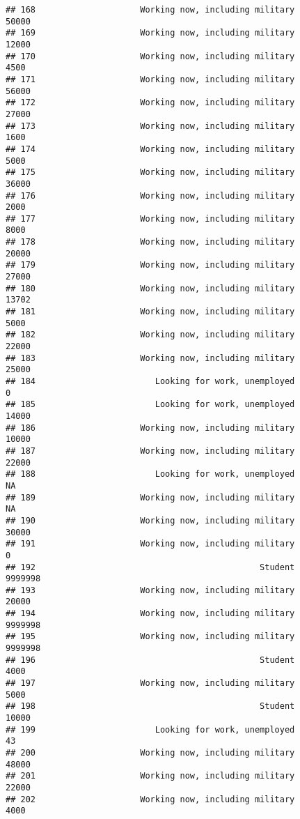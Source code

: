 \documentclass[]{book}
\theoremstyle{definition}
\theoremstyle{definition}
\theoremstyle{remark}
\begin{document}
\begin{verbatim}
## 168                     Working now, including military           50000
## 169                     Working now, including military           12000
## 170                     Working now, including military            4500
## 171                     Working now, including military           56000
## 172                     Working now, including military           27000
## 173                     Working now, including military            1600
## 174                     Working now, including military            5000
## 175                     Working now, including military           36000
## 176                     Working now, including military            2000
## 177                     Working now, including military            8000
## 178                     Working now, including military           20000
## 179                     Working now, including military           27000
## 180                     Working now, including military           13702
## 181                     Working now, including military            5000
## 182                     Working now, including military           22000
## 183                     Working now, including military           25000
## 184                        Looking for work, unemployed               0
## 185                        Looking for work, unemployed           14000
## 186                     Working now, including military           10000
## 187                     Working now, including military           22000
## 188                        Looking for work, unemployed              NA
## 189                     Working now, including military              NA
## 190                     Working now, including military           30000
## 191                     Working now, including military               0
## 192                                             Student         9999998
## 193                     Working now, including military           20000
## 194                     Working now, including military         9999998
## 195                     Working now, including military         9999998
## 196                                             Student            4000
## 197                     Working now, including military            5000
## 198                                             Student           10000
## 199                        Looking for work, unemployed              43
## 200                     Working now, including military           48000
## 201                     Working now, including military           22000
## 202                     Working now, including military            4000

\end{verbatim}
\end{document}
